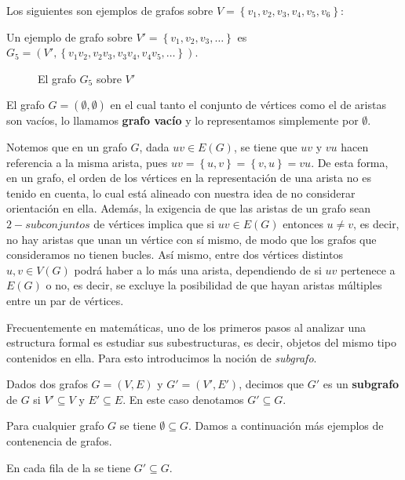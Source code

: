 \begin{Ejm} \label{Ejm:cuatro_grafos}
   Los siguientes son ejemplos de grafos sobre $V=\left\lbrace v_1,v_2,v_3,v_4,v_5, v_6 \right\rbrace$:
  
   Un ejemplo de grafo sobre $V'=\left\lbrace v_1, v_2, v_3, \dots\right\rbrace$ es $G_5=(V',\left\lbrace v_1v_2, v_2v_3, v_3v_4, v_4v_5, \dots\right\rbrace)$.
   \begin{figure}[H]
     \centering
       \resizebox{0.45\textwidth}{!}{} 
     \caption{El grafo $G_5$ sobre $V'$}
   \end{figure}
\end{Ejm}
\begin{Not}
   El grafo $G=(\emptyset,\emptyset)$ en el cual tanto el conjunto de vértices como el de aristas son vacíos, lo llamamos \textbf{grafo vacío} y lo representamos simplemente por $\emptyset$.
\end{Not}
Notemos que en un grafo $G$, dada $uv\in E(G)$, se tiene que $uv$ y $vu$ hacen referencia a la misma arista, pues $uv=\left\lbrace u,v \right\rbrace=\left\lbrace v, u\right\rbrace=vu$. De esta forma, en un grafo, el orden de los vértices en la representación de una arista no es tenido en cuenta, lo cual está alineado con nuestra idea de no considerar orientación en ella. Además, la exigencia de que las aristas de un grafo sean $2-subconjuntos$ de vértices implica que si $uv\in E(G)$ entonces $u\neq v$, es decir, no hay aristas que unan un vértice con sí mismo, de modo que los grafos que consideramos no tienen bucles. Así mismo, entre dos vértices distintos $u,v\in V(G)$ podrá haber a lo más una arista, dependiendo de si $uv$ pertenece a $E(G)$ o no, es decir, se excluye la posibilidad de que hayan aristas múltiples entre un par de vértices.\par
Frecuentemente en matemáticas, uno de los primeros pasos al analizar una estructura formal es estudiar sus subestructuras, es decir, objetos del mismo tipo contenidos en ella. Para esto introducimos la noción de \textit{subgrafo}.\clearpage
\begin{Def}
   Dados dos grafos $G=(V,E)$ y $G'=(V',E')$, decimos que $G'$ es un \textbf{subgrafo} de $G$ si $V'\subseteq V$ y $E'\subseteq E$. En este caso denotamos $G'\subseteq G$.
\end{Def}
Para cualquier grafo $G$ se tiene $\emptyset\subseteq G$. Damos a continuación más ejemplos de contenencia de grafos.
\begin{Ejm}\label{Ejm:Contenencia}
   En cada fila de la  se tiene $G'\subseteq G$.
   
\end{Ejm}\clearpage
